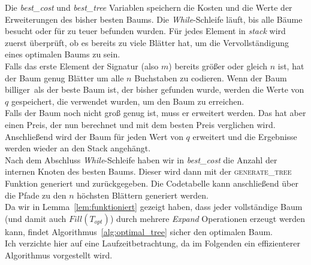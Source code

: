 \documentclass[a4paper,10pt,ngerman]{scrartcl}
\begin{document}
    Die \textit{best\_cost} und \textit{best\_tree} Variablen speichern die Kosten und die Werte der Erweiterungen des bisher besten Baums.
    Die \textit{While}-Schleife läuft, bis alle Bäume besucht oder für zu teuer befunden wurden.
    Für jedes Element in \textit{stack} wird zuerst überprüft, ob es bereits zu viele Blätter hat, um die Vervollständigung eines optimalen Baums zu sein.\\
    Falls das erste Element der Signatur (also $m$) bereits größer oder gleich $n$ ist, hat der Baum genug Blätter um alle $n$ Buchstaben zu codieren.
    Wenn der Baum \glqq billiger\grqq~als der beste Baum ist, der bisher gefunden wurde, werden die Werte von $q$ gespeichert, die verwendet wurden, um den Baum zu erreichen. \\
    Falls der Baum noch nicht groß genug ist, muss er erweitert werden.
    Das hat aber einen Preis, der nun berechnet und mit dem besten Preis verglichen wird. \\
    Anschließend wird der Baum für jeden Wert von $q$ erweitert und die Ergebnisse werden wieder an den Stack angehängt. \\
    Nach dem Abschluss \textit{While}-Schleife haben wir in \textit{best\_cost} die Anzahl der internen Knoten des besten Baums.
    Dieser wird dann mit der \textsc{generate\_tree} Funktion generiert und zurückgegeben.
    Die Codetabelle kann anschließend über die Pfade zu den $n$ höchsten Blättern generiert werden. \\
    Da wir in Lemma~\ref{lem:funktioniert} gezeigt haben, dass jeder vollständige Baum (und damit auch $Fill(T_{opt})$) durch mehrere \textit{Expand} Operationen erzeugt werden kann, findet Algorithmus~\ref{alg:optimal_tree} sicher den optimalen Baum. \\
    Ich verzichte hier auf eine Laufzeitbetrachtung, da im Folgenden ein effizienterer Algorithmus vorgestellt wird.
\end{document}
